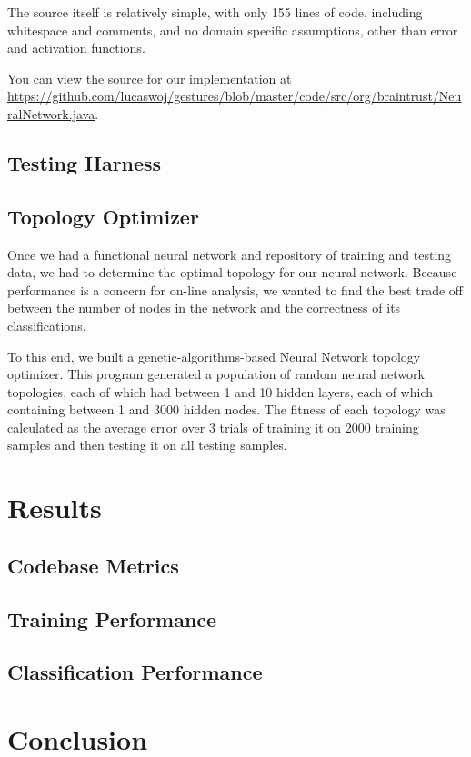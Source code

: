 \documentclass{report}
\begin{document}
The source itself is relatively simple, with only 155 lines of code, including whitespace and comments, and no domain specific assumptions, other than error and activation functions.

You can view the source for our implementation at \url{https://github.com/lucaswoj/gestures/blob/master/code/src/org/braintrust/NeuralNetwork.java}.

\section{Testing Harness}

\section{Topology Optimizer}


Once we had a functional neural network and repository of training and testing data, we had to determine the optimal topology for our neural network. Because performance is a concern for on-line analysis, we wanted to find the best trade off between the number of nodes in the network and the correctness of its classifications.

To this end, we built a genetic-algorithms-based Neural Network topology optimizer. This program generated a population of random neural network topologies, each of which had between 1 and 10 hidden layers, each of which containing between 1 and 3000 hidden nodes. The fitness of each topology was calculated as the average error over 3 trials of training it on 2000 training samples and then testing it on all testing samples.

\chapter{Results}

\section{Codebase Metrics}


\section{Training Performance}


\section{Classification Performance}


\chapter{Conclusion}


\printbibliography
\end{document}
